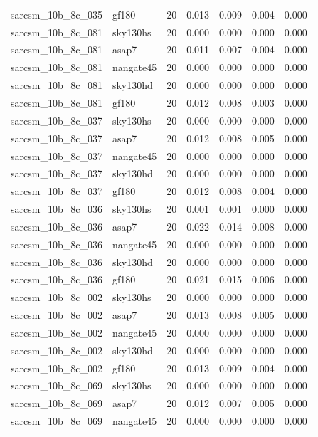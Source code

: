 \begin{tabular}{llrrrrr}
sarcsm\_10b\_8c\_035 & gf180 & 20 & 0.013 & 0.009 & 0.004 & 0.000 \\
sarcsm\_10b\_8c\_081 & sky130hs & 20 & 0.000 & 0.000 & 0.000 & 0.000 \\
sarcsm\_10b\_8c\_081 & asap7 & 20 & 0.011 & 0.007 & 0.004 & 0.000 \\
sarcsm\_10b\_8c\_081 & nangate45 & 20 & 0.000 & 0.000 & 0.000 & 0.000 \\
sarcsm\_10b\_8c\_081 & sky130hd & 20 & 0.000 & 0.000 & 0.000 & 0.000 \\
sarcsm\_10b\_8c\_081 & gf180 & 20 & 0.012 & 0.008 & 0.003 & 0.000 \\
sarcsm\_10b\_8c\_037 & sky130hs & 20 & 0.000 & 0.000 & 0.000 & 0.000 \\
sarcsm\_10b\_8c\_037 & asap7 & 20 & 0.012 & 0.008 & 0.005 & 0.000 \\
sarcsm\_10b\_8c\_037 & nangate45 & 20 & 0.000 & 0.000 & 0.000 & 0.000 \\
sarcsm\_10b\_8c\_037 & sky130hd & 20 & 0.000 & 0.000 & 0.000 & 0.000 \\
sarcsm\_10b\_8c\_037 & gf180 & 20 & 0.012 & 0.008 & 0.004 & 0.000 \\
sarcsm\_10b\_8c\_036 & sky130hs & 20 & 0.001 & 0.001 & 0.000 & 0.000 \\
sarcsm\_10b\_8c\_036 & asap7 & 20 & 0.022 & 0.014 & 0.008 & 0.000 \\
sarcsm\_10b\_8c\_036 & nangate45 & 20 & 0.000 & 0.000 & 0.000 & 0.000 \\
sarcsm\_10b\_8c\_036 & sky130hd & 20 & 0.000 & 0.000 & 0.000 & 0.000 \\
sarcsm\_10b\_8c\_036 & gf180 & 20 & 0.021 & 0.015 & 0.006 & 0.000 \\
sarcsm\_10b\_8c\_002 & sky130hs & 20 & 0.000 & 0.000 & 0.000 & 0.000 \\
sarcsm\_10b\_8c\_002 & asap7 & 20 & 0.013 & 0.008 & 0.005 & 0.000 \\
sarcsm\_10b\_8c\_002 & nangate45 & 20 & 0.000 & 0.000 & 0.000 & 0.000 \\
sarcsm\_10b\_8c\_002 & sky130hd & 20 & 0.000 & 0.000 & 0.000 & 0.000 \\
sarcsm\_10b\_8c\_002 & gf180 & 20 & 0.013 & 0.009 & 0.004 & 0.000 \\
sarcsm\_10b\_8c\_069 & sky130hs & 20 & 0.000 & 0.000 & 0.000 & 0.000 \\
sarcsm\_10b\_8c\_069 & asap7 & 20 & 0.012 & 0.007 & 0.005 & 0.000 \\
sarcsm\_10b\_8c\_069 & nangate45 & 20 & 0.000 & 0.000 & 0.000 & 0.000 \\

\end{tabular}
